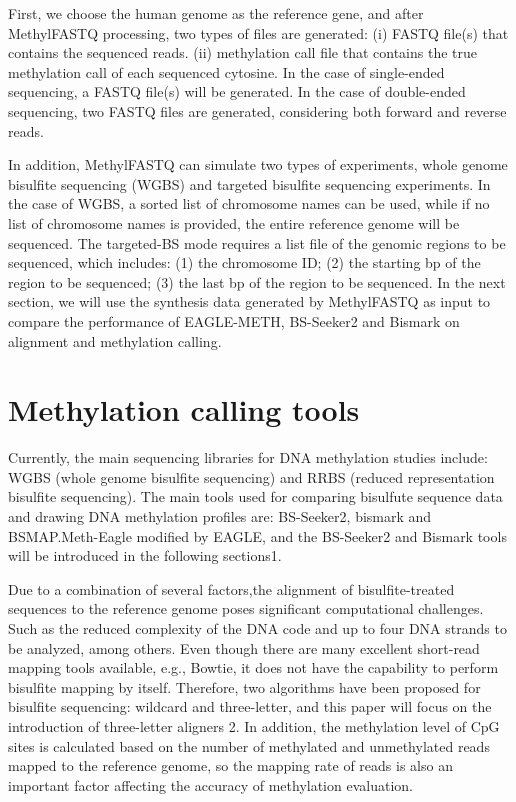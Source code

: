 \documentclass{PHlab-thesis}
\begin{document}
\par
First, we choose the human genome as the reference gene, and after MethylFASTQ processing, two types of files are generated:
(i) FASTQ file(s) that contains the sequenced reads.
(ii) methylation call file that contains the true methylation call of each sequenced cytosine.
In the case of single-ended sequencing, a FASTQ file(s) will be generated. In the case of double-ended sequencing, two FASTQ files are generated, considering both forward and reverse reads.

\par
In addition, MethylFASTQ can simulate two types of experiments, whole genome bisulfite sequencing (WGBS) and targeted bisulfite sequencing experiments. In the case of WGBS, a sorted list of chromosome names can be used, while if no list of chromosome names is provided, the entire reference genome will be sequenced. The targeted-BS mode requires a list file of the genomic regions to be sequenced, which includes:
(1) the chromosome ID;
(2) the starting bp of the region to be sequenced; 
(3) the last bp of the region to be sequenced. 
In the next section, we will use the synthesis data generated by MethylFASTQ as input to compare the performance of EAGLE-METH, BS-Seeker2 and Bismark on alignment and methylation calling.
\section{Methylation calling tools}
Currently, the main sequencing libraries for DNA methylation studies include: WGBS (whole genome bisulfite sequencing) and RRBS (reduced representation bisulfite sequencing). The main tools used for comparing bisulfute sequence data and drawing DNA methylation profiles are: BS-Seeker2, bismark and BSMAP.Meth-Eagle modified by EAGLE, and the BS-Seeker2 and Bismark tools will be introduced in the following sections{1}. 

\par
Due to a combination of several factors,the alignment of bisulfite-treated sequences to the reference genome poses significant computational challenges. Such as the reduced complexity of the DNA code and up to four DNA strands to be analyzed, among others. Even though there are many excellent short-read mapping tools available, e.g., Bowtie, it does not have the capability to perform bisulfite mapping by itself. Therefore, two algorithms have been proposed for bisulfite sequencing: wildcard and three-letter, and this paper will focus on the introduction of three-letter aligners {2}. In addition, the methylation level of CpG sites is calculated based on the number of methylated and unmethylated reads mapped to the reference genome, so the mapping rate of reads is also an important factor affecting the accuracy of methylation evaluation.
\end{document}
